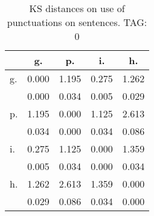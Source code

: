 \begin{table}[h!]
\begin{center}
\begin{tabular}{| l | c | c | c | c |}\hline
 & g. & p. & i. & h. \\\hline
g. & 0.000  & 1.195  & 0.275  & 1.262 \\\hline
 & 0.000  & 0.034  & 0.005  & 0.029 \\\hline
p. & 1.195  & 0.000  & 1.125  & 2.613 \\\hline
 & 0.034  & 0.000  & 0.034  & 0.086 \\\hline
i. & 0.275  & 1.125  & 0.000  & 1.359 \\\hline
 & 0.005  & 0.034  & 0.000  & 0.034 \\\hline
h. & 1.262  & 2.613  & 1.359  & 0.000 \\\hline
 & 0.029  & 0.086  & 0.034  & 0.000 \\\hline
\end{tabular}
\caption{KS distances on use of punctuations on sentences. TAG: 0}
\end{center}
\end{table}
